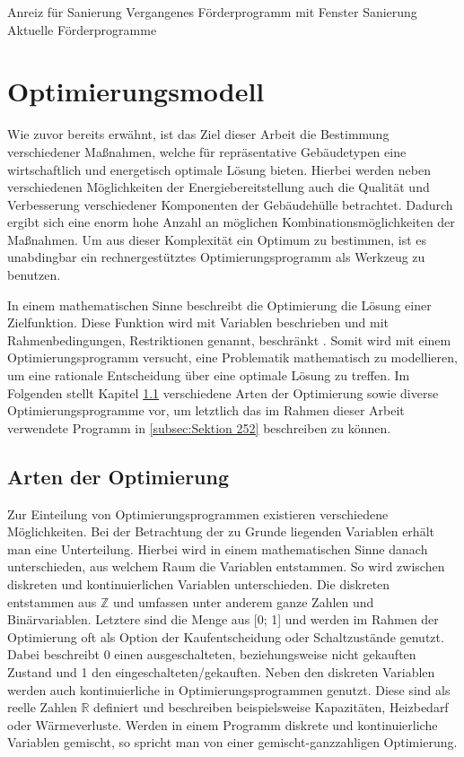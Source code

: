 Anreiz für Sanierung
Vergangenes Förderprogramm mit Fenster Sanierung
Aktuelle Förderprogramme


\section{Optimierungsmodell}
\label{sec:Sektion 25}

Wie zuvor bereits erwähnt, ist das Ziel dieser Arbeit die Bestimmung verschiedener Maßnahmen, welche für repräsentative Gebäudetypen eine wirtschaftlich und energetisch optimale Lösung bieten.
Hierbei werden neben verschiedenen Möglichkeiten der Energiebereitstellung auch die Qualität und Verbesserung verschiedener Komponenten der Gebäudehülle betrachtet.
Dadurch ergibt sich eine enorm hohe Anzahl an möglichen Kombinationsmöglichkeiten der Maßnahmen.
Um aus dieser Komplexität ein Optimum zu bestimmen, ist es unabdingbar ein rechnergestütztes Optimierungsprogramm als Werkzeug zu benutzen.

In einem mathematischen Sinne beschreibt die Optimierung die Lösung einer Zielfunktion.
Diese Funktion wird mit Variablen beschrieben und mit Rahmenbedingungen, Restriktionen genannt, beschränkt \cite{Schellong.2016}.
Somit wird mit einem Optimierungsprogramm versucht, eine Problematik mathematisch zu modellieren, um eine rationale Entscheidung über eine optimale Lösung zu treffen. 
Im Folgenden stellt Kapitel \ref{subsec:Sektion 251} verschiedene Arten der Optimierung sowie diverse Optimierungsprogramme vor, um letztlich das im Rahmen dieser Arbeit verwendete Programm in \ref{subsec:Sektion 252} beschreiben zu können.

\subsection{Arten der Optimierung}
\label{subsec:Sektion 251}

Zur Einteilung von Optimierungsprogrammen existieren verschiedene Möglichkeiten.
Bei der Betrachtung der zu Grunde liegenden Variablen erhält man eine Unterteilung.
Hierbei wird in einem mathematischen Sinne danach unterschieden, aus welchem Raum die Variablen entstammen.
So wird zwischen diskreten und kontinuierlichen Variablen unterschieden. 
Die diskreten entstammen aus \(\mathbb{Z	}\) und umfassen unter anderem ganze Zahlen und Binärvariablen.
Letztere sind die Menge aus [0; 1] und werden im Rahmen der Optimierung oft als Option der Kaufentscheidung oder Schaltzustände genutzt. %
Dabei beschreibt 0 einen ausgeschalteten, beziehungsweise nicht gekauften Zustand und 1 den eingeschalteten/gekauften.
Neben den diskreten Variablen werden auch kontinuierliche in Optimierungsprogrammen genutzt. 
Diese sind als reelle Zahlen \(\mathbb{R}\) definiert und beschreiben beispielsweise Kapazitäten, Heizbedarf oder Wärmeverluste.
Werden in einem Programm diskrete und kontinuierliche Variablen gemischt, so spricht man von einer gemischt-ganzzahligen Optimierung. \cite{Schellong.2016}

